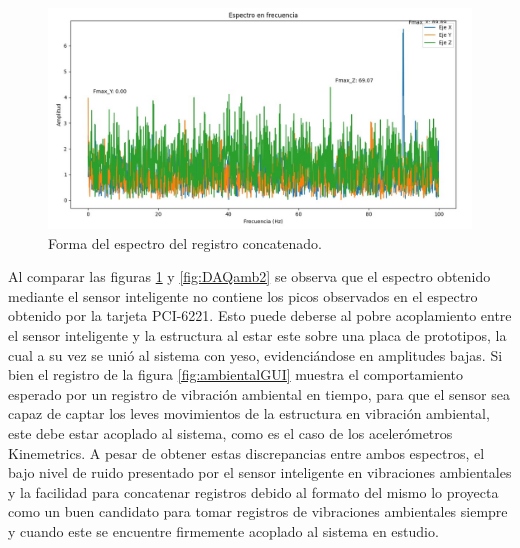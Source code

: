 \begin{figure}[H]
    \centering
    \includegraphics[width = \textwidth]{imagenes/cap3_resultados/Ensayos/VibAmb2EspectroCONC.jpg}
    \caption{Forma del espectro del registro concatenado.}
    \label{fig:espectroconc}
\end{figure}



Al comparar las figuras \ref{fig:espectroconc} y \ref{fig:DAQamb2} se observa que el espectro obtenido mediante el sensor inteligente no contiene los picos observados en el espectro obtenido por la tarjeta PCI-6221. Esto puede deberse al pobre acoplamiento entre el sensor inteligente y la estructura al estar este sobre una placa de prototipos, la cual a su vez se unió al sistema con yeso, evidenciándose en amplitudes bajas. Si bien el registro de la figura \ref{fig:ambientalGUI} muestra el comportamiento esperado por un registro de vibración ambiental en tiempo, para que el sensor sea capaz de captar los leves movimientos de la estructura en vibración ambiental, este debe estar acoplado al sistema, como es el caso de los acelerómetros Kinemetrics. A pesar de obtener estas discrepancias entre ambos espectros, el bajo nivel de ruido presentado por el sensor inteligente en vibraciones ambientales y la facilidad para concatenar registros debido al formato del mismo lo proyecta como un buen candidato para tomar registros de vibraciones ambientales siempre y cuando este se encuentre firmemente acoplado al sistema en estudio.
